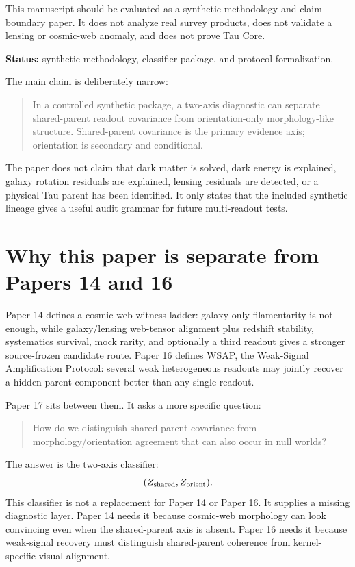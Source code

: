 \documentclass[12pt]{article}
\begin{document}
This manuscript should be evaluated as a synthetic methodology and
claim-boundary paper.  It does not analyze real survey products, does not
validate a lensing or cosmic-web anomaly, and does not prove Tau Core.

\noindent\textbf{Status:} synthetic methodology, classifier package, and
protocol formalization.

The main claim is deliberately narrow:
\begin{quote}
In a controlled synthetic package, a two-axis diagnostic can separate
shared-parent readout covariance from orientation-only morphology-like
structure.  Shared-parent covariance is the primary evidence axis;
orientation is secondary and conditional.
\end{quote}

The paper does not claim that dark matter is solved, dark energy is explained,
galaxy rotation residuals are explained, lensing residuals are detected, or a
physical Tau parent has been identified.  It only states that the included
synthetic lineage gives a useful audit grammar for future multi-readout tests.

\section{Why this paper is separate from Papers 14 and 16}

Paper 14 defines a cosmic-web witness ladder: galaxy-only filamentarity is not
enough, while galaxy/lensing web-tensor alignment plus redshift stability,
systematics survival, mock rarity, and optionally a third readout gives a
stronger source-frozen candidate route.  Paper 16 defines WSAP, the Weak-Signal
Amplification Protocol: several weak heterogeneous readouts may jointly recover
a hidden parent component better than any single readout.

Paper 17 sits between them.  It asks a more specific question:
\begin{quote}
How do we distinguish shared-parent covariance from morphology/orientation
agreement that can also occur in null worlds?
\end{quote}

The answer is the two-axis classifier:
\[
  (Z_{\rm shared},Z_{\rm orient}).
\]
This classifier is not a replacement for Paper 14 or Paper 16.  It supplies a
missing diagnostic layer.  Paper 14 needs it because cosmic-web morphology can
look convincing even when the shared-parent axis is absent.  Paper 16 needs it
because weak-signal recovery must distinguish shared-parent coherence from
kernel-specific visual alignment.
\end{document}
